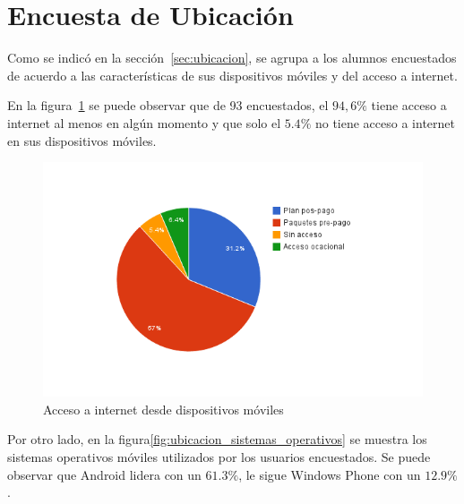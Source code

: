 

\section{Encuesta de Ubicación}
\label{sec:res_UBICACION}

Como se indicó en la sección~\ref{sec:ubicacion}, se agrupa a los alumnos
encuestados de acuerdo a las características de sus dispositivos móviles y del
acceso a internet.

En la figura~\ref{fig:ubicacion_acceso_internet} se puede observar que de 93
encuestados, el $94,6\%$ tiene acceso a internet al menos en algún momento y que
solo el $5.4\%$ no tiene acceso a internet en sus dispositivos móviles.

\begin{figure}[ht!]
\centering
\includegraphics[scale=0.8]{resultados/imagenes/ubicacion_acceso_internet.png}
\caption{Acceso a internet desde dispositivos móviles}
\label{fig:ubicacion_acceso_internet}
\end{figure}

Por otro lado, en la figura\ref{fig:ubicacion_sistemas_operativos} se muestra
los sistemas operativos móviles utilizados por los usuarios encuestados. Se
puede observar que Android lidera con un $61.3\%$, le sigue Windows Phone con un
$12.9\%$.

